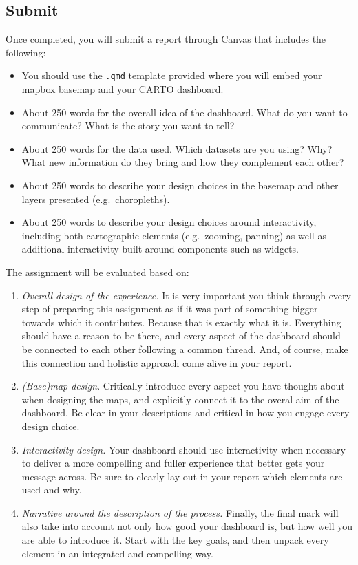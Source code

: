 \documentclass[
  letterpaper,
  DIV=11,
  numbers=noendperiod]{scrreprt}
\providecommand{\tightlist}{%
  \setlength{\itemsep}{0pt}\setlength{\parskip}{0pt}}\usepackage{longtable,booktabs,array}
\begin{document}
\subsection*{Submit}\label{submit-1}

Once completed, you will submit a report through Canvas that includes
the following:

\begin{itemize}
\tightlist
\item
  You should use the \texttt{.qmd} template provided where you will
  embed your mapbox basemap and your CARTO dashboard.
\item
  About 250 words for the overall idea of the dashboard. What do you
  want to communicate? What is the story you want to tell?
\item
  About 250 words for the data used. Which datasets are you using? Why?
  What new information do they bring and how they complement each other?
\item
  About 250 words to describe your design choices in the basemap and
  other layers presented (e.g.~choropleths).
\item
  About 250 words to describe your design choices around interactivity,
  including both cartographic elements (e.g.~zooming, panning) as well
  as additional interactivity built around components such as widgets.
\end{itemize}

The assignment will be evaluated based on:

\begin{enumerate}
\def\labelenumi{\arabic{enumi}.}
\item
  \emph{Overall design of the experience.} It is very important you
  think through every step of preparing this assignment as if it was
  part of something bigger towards which it contributes. Because that is
  exactly what it is. Everything should have a reason to be there, and
  every aspect of the dashboard should be connected to each other
  following a common thread. And, of course, make this connection and
  holistic approach come alive in your report.
\item
  \emph{(Base)map design}. Critically introduce every aspect you have
  thought about when designing the maps, and explicitly connect it to
  the overal aim of the dashboard. Be clear in your descriptions and
  critical in how you engage every design choice.
\item
  \emph{Interactivity design.} Your dashboard should use interactivity
  when necessary to deliver a more compelling and fuller experience that
  better gets your message across. Be sure to clearly lay out in your
  report which elements are used and why.
\item
  \emph{Narrative around the description of the process.} Finally, the
  final mark will also take into account not only how good your
  dashboard is, but how well you are able to introduce it. Start with
  the key goals, and then unpack every element in an integrated and
  compelling way.
\end{enumerate}
\end{document}
